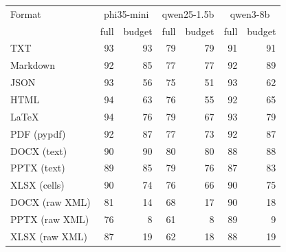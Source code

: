 \begin{tabular}{lrrrrrr}
\toprule
Format & \multicolumn{2}{c}{phi35-mini} & \multicolumn{2}{c}{qwen25-1.5b} & \multicolumn{2}{c}{qwen3-8b} \\
 & full & budget & full & budget & full & budget \\
\midrule
TXT & 93 & 93 & 79 & 79 & 91 & 91 \\
Markdown & 92 & 85 & 77 & 77 & 92 & 89 \\
JSON & 93 & 56 & 75 & 51 & 93 & 62 \\
HTML & 94 & 63 & 76 & 55 & 92 & 65 \\
LaTeX & 94 & 76 & 79 & 67 & 93 & 79 \\
PDF (pypdf) & 92 & 87 & 77 & 73 & 92 & 87 \\
DOCX (text) & 90 & 90 & 80 & 80 & 88 & 88 \\
PPTX (text) & 89 & 85 & 79 & 76 & 87 & 83 \\
XLSX (cells) & 90 & 74 & 76 & 66 & 90 & 75 \\
DOCX (raw XML) & 81 & 14 & 68 & 17 & 90 & 18 \\
PPTX (raw XML) & 76 & 8 & 61 & 8 & 89 & 9 \\
XLSX (raw XML) & 87 & 19 & 62 & 18 & 88 & 19 \\
\bottomrule
\end{tabular}
